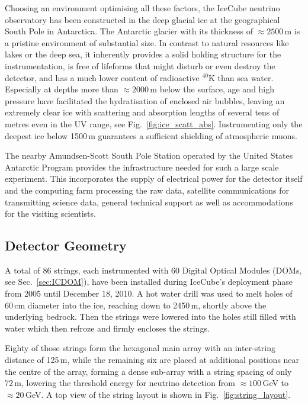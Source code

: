 Choosing an environment optimising all these factors, the IceCube neutrino 
observatory has been constructed in the deep glacial ice at the geographical 
South Pole in Antarctica. The Antarctic glacier with its thickness of $\approx 
2500$\,m is a pristine environment of substantial size. In contrast to natural 
resources like lakes or the deep sea, it inherently provides a solid holding 
structure for the instrumentation, is free of lifeforms that might disturb or 
even destroy the detector, and has a much lower content of radioactive $^{40}$K 
than sea water. Especially at depths more than $\approx 2000$\,m below the 
surface, age and high pressure have facilitated the hydratisation of enclosed 
air bubbles, leaving an extremely clear ice with scattering and absorption 
lengths of several tens of metres even in the UV range, see 
Fig.~\ref{fig:ice_scatt_abs}. Instrumenting only the deepest ice below 1500\,m 
guarantees a sufficient shielding of atmospheric muons. 

The nearby Amundsen-Scott South Pole Station operated by the United States 
Antarctic Program provides the infrastructure needed for such a large scale 
experiment. This incorporates the supply of electrical power for the detector 
itself and the computing farm processing the raw data, satellite communications 
for transmitting science data, general technical support as well as 
accommodations for the visiting scientists.

\subsection{Detector Geometry}
\label{sec:ICgeometry}

A total of 86 strings, each instrumented with 60 Digital Optical Modules (DOMs, 
see Sec.~\ref{sec:ICDOM}), have been installed during IceCube's deployment phase 
from 2005 until December 18, 2010. A hot water drill was used to melt holes of 
60\,cm diameter into the ice, reaching down to 2450\,m, shortly above the 
underlying bedrock. Then the strings were lowered into the holes still filled 
with water which then refroze and firmly encloses the strings.

Eighty of those strings form the hexagonal main array with an inter-string 
distance of 125\,m, while the remaining six are placed at additional positions 
near the centre of the array, forming a dense sub-array with a string spacing 
of only 72\,m, lowering the threshold energy for neutrino detection from 
$\approx 100$\,GeV to $\approx 20$\,GeV. A top view of the string layout is 
shown in Fig.~\ref{fig:string_layout}.

